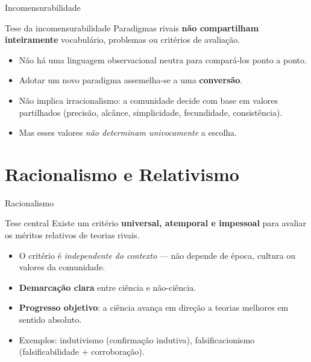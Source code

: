 \documentclass[aspectratio=169]{beamer}
\newcommand{\impt}[1]{\textcolor{maccent}{\textbf{#1}}}
\newcommand{\ntc}[1]{\textcolor{mprimary}{#1}}
\begin{document}
\begin{frame}{Incomensurabilidade}
\begin{alertblock}{Tese da incomensurabilidade}
Paradigmas rivais \impt{n\~ao compartilham inteiramente} vocabul\'ario, problemas ou crit\'erios de avalia\c c\~ao.
\end{alertblock}
\vspace{0.3cm}
\begin{itemize}
    \item N\~ao h\'a uma linguagem observacional neutra para compar\'a-los ponto a ponto.
    \item Adotar um novo paradigma assemelha-se a uma \impt{convers\~ao}.
    \item N\~ao implica irracionalismo: a comunidade decide com base em valores partilhados (\ntc{precis\~ao, alc\^ance, simplicidade, fecundidade, consist\^encia}).
    \item Mas esses valores \emph{n\~ao determinam univocamente} a escolha.
\end{itemize}
\end{frame}

\section{Racionalismo e Relativismo}

\begin{frame}{Racionalismo}
\begin{block}{Tese central}
Existe um crit\'erio \impt{universal, atemporal e impessoal} para avaliar os m\'eritos relativos de teorias rivais.
\end{block}
\vspace{0.3cm}
\begin{itemize}
    \item O crit\'erio \'e \emph{independente do contexto} --- n\~ao depende de \'epoca, cultura ou valores da comunidade.
    \item \impt{Demarca\c c\~ao clara} entre ci\^encia e n\~ao-ci\^encia.
    \item \impt{Progresso objetivo}: a ci\^encia avan\c ca em dire\c c\~ao a teorias melhores em sentido absoluto.
\end{itemize}
\vspace{0.2cm}
\begin{itemize}
    \item \ntc{Exemplos}: indutivismo (confirma\c c\~ao indutiva), falsificacionismo (falsificabilidade + corrobora\c c\~ao).
\end{itemize}
\end{frame}
\end{document}
